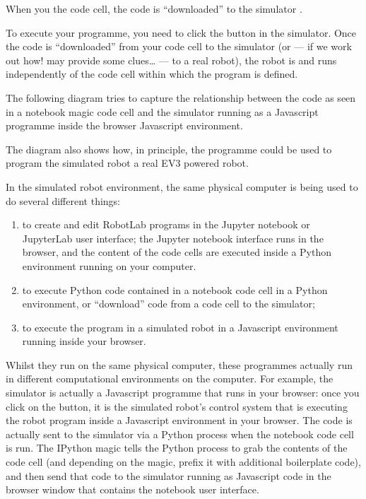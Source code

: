 \documentclass[letterpaper,10pt,english]{sphinxmanual}
\let\sphinxpxdimen\pdfpxdimen\else\newdimen\sphinxpxdimen
\begin{document}
When you  the code cell, the code is “downloaded” to the simulator .

To execute your programme, you need to click the  button in the simulator. Once the code is “downloaded” from your code cell to the simulator (or — if we work out how!  may provide some clues… — to a real robot), the robot is  and runs independently of the code cell within which the program is defined.

The following diagram tries to capture the relationship between the code as seen in a notebook magic code cell and the simulator running as a Javascript programme inside the browser Javascript environment.

\sphinxincludegraphics[width=491\sphinxpxdimen,height=301\sphinxpxdimen]{{ev3dev-codearchitecture}.png}

The diagram also shows how, in principle, the  programme could be used to program the simulated robot  a real EV3 powered robot.

In the simulated robot environment, the same physical computer is being used to do several different things:
\begin{enumerate}
%
\item {} 
to create and edit RobotLab programs in the Jupyter notebook or JupyterLab user interface; the Jupyter notebook interface runs in the browser, and the content of the code cells are executed inside a Python environment running on your computer.

\item {} 
to execute Python code contained in a notebook code cell in a Python environment, or “download” code from a code cell to the simulator;

\item {} 
to execute the program in a simulated robot in a Javascript environment running inside your browser.

\end{enumerate}

Whilst they run on the same physical computer, these programmes actually run in different computational environments on the computer. For example, the simulator is actually a Javascript programme that runs in your browser: once you click on the  button, it is the simulated robot’s control system that is executing the robot program inside a Javascript environment in your browser. The code is actually sent to the simulator via a Python process when the notebook code cell is run. The IPython
magic tells the Python process to grab the contents of the code cell (and depending on the magic, prefix it with additional boilerplate code), and then send that code to the simulator running as Javascript code in the browser window that contains the notebook user interface.
\end{document}
